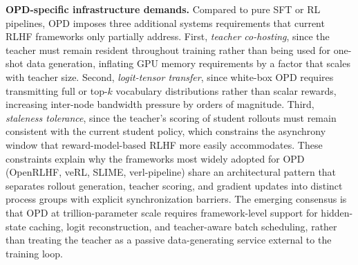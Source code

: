 \documentclass{article} %
\begin{document}
\textbf{OPD-specific infrastructure demands.} Compared to pure SFT or RL pipelines, OPD imposes three additional systems requirements that current RLHF frameworks only partially address. First, \emph{teacher co-hosting}, since the teacher must remain resident throughout training rather than being used for one-shot data generation, inflating GPU memory requirements by a factor that scales with teacher size. Second, \emph{logit-tensor transfer}, since white-box OPD requires transmitting full or top-$k$ vocabulary distributions rather than scalar rewards, increasing inter-node bandwidth pressure by orders of magnitude. Third, \emph{staleness tolerance}, since the teacher's scoring of student rollouts must remain consistent with the current student policy, which constrains the asynchrony window that reward-model-based RLHF more easily accommodates. These constraints explain why the frameworks most widely adopted for OPD (OpenRLHF, veRL, SLIME, verl-pipeline) share an architectural pattern that separates rollout generation, teacher scoring, and gradient updates into distinct process groups with explicit synchronization barriers. The emerging consensus is that OPD at trillion-parameter scale requires framework-level support for hidden-state caching, logit reconstruction, and teacher-aware batch scheduling, rather than treating the teacher as a passive data-generating service external to the training loop.
\end{document}
